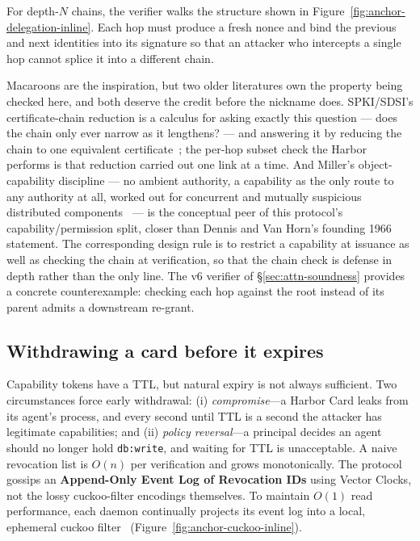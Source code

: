 \documentclass[11pt,a4paper]{article}
\theoremstyle{definition}
\begin{document}


For depth-$N$ chains, the verifier walks the structure shown in Figure~\ref{fig:anchor-delegation-inline}. Each hop must produce a fresh nonce and bind the previous and next identities into its signature so that an attacker who intercepts a single hop cannot splice it into a different chain.

Macaroons are the inspiration, but two older literatures own the property being checked here, and both deserve the credit before the nickname does. SPKI/SDSI's certificate-chain reduction is a calculus for asking exactly this question --- does the chain only ever narrow as it lengthens? --- and answering it by reducing the chain to one equivalent certificate~; the per-hop subset check the Harbor performs is that reduction carried out one link at a time. And Miller's object-capability discipline --- no ambient authority, a capability as the only route to any authority at all, worked out for concurrent and mutually suspicious distributed components~ --- is the conceptual peer of this protocol's capability/permission split, closer than Dennis and Van Horn's founding 1966 statement. The corresponding design rule is to restrict a capability at issuance as well as checking the chain at verification, so that the chain check is defense in depth rather than the only line. The v6 verifier of \S\ref{sec:attn-soundness} provides a concrete counterexample: checking each hop against the root instead of its parent admits a downstream re-grant.



\subsection{Withdrawing a card before it expires}\label{sec:revocation}

%
Capability tokens have a TTL, but natural expiry is not always sufficient. Two circumstances force early withdrawal: (i) \emph{compromise}---a Harbor Card leaks from its agent's process, and every second until TTL is a second the attacker has legitimate capabilities; and (ii) \emph{policy reversal}---a principal decides an agent should no longer hold \texttt{db:write}, and waiting for TTL is unacceptable. A naive revocation list is $O(n)$ per verification and grows monotonically. The protocol gossips an \textbf{Append-Only Event Log of Revocation IDs} using Vector Clocks, not the lossy cuckoo-filter encodings themselves. To maintain $O(1)$ read performance, each daemon continually projects its event log into a local, ephemeral cuckoo filter~ (Figure~\ref{fig:anchor-cuckoo-inline}).
\end{document}

